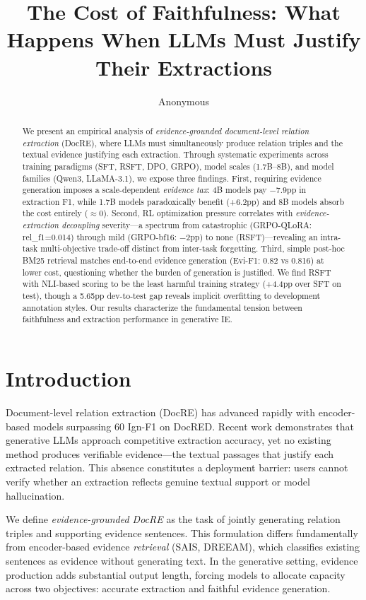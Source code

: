 \documentclass[11pt]{article}
\title{The Cost of Faithfulness: What Happens When LLMs Must Justify Their Extractions}
\author{Anonymous}
\date{}
\begin{document}
\maketitle

\begin{abstract}
We present an empirical analysis of \textit{evidence-grounded document-level relation extraction} (DocRE), where LLMs must simultaneously produce relation triples and the textual evidence justifying each extraction. Through systematic experiments across training paradigms (SFT, RSFT, DPO, GRPO), model scales (1.7B--8B), and model families (Qwen3, LLaMA-3.1), we expose three findings. First, requiring evidence generation imposes a scale-dependent \textit{evidence tax}: 4B models pay $-7.9$pp in extraction F1, while 1.7B models paradoxically benefit (+6.2pp) and 8B models absorb the cost entirely ($\approx 0$). Second, RL optimization pressure correlates with \textit{evidence-extraction decoupling} severity---a spectrum from catastrophic (GRPO-QLoRA: rel\_f1=0.014) through mild (GRPO-bf16: $-2$pp) to none (RSFT)---revealing an intra-task multi-objective trade-off distinct from inter-task forgetting. Third, simple post-hoc BM25 retrieval matches end-to-end evidence generation (Evi-F1: 0.82 vs 0.816) at lower cost, questioning whether the burden of generation is justified. We find RSFT with NLI-based scoring to be the least harmful training strategy (+4.4pp over SFT on test), though a 5.65pp dev-to-test gap reveals implicit overfitting to development annotation styles. Our results characterize the fundamental tension between faithfulness and extraction performance in generative IE.
\end{abstract}

\section{Introduction}

Document-level relation extraction (DocRE) has advanced rapidly with encoder-based models surpassing 60 Ign-F1 on DocRED. Recent work demonstrates that generative LLMs approach competitive extraction accuracy, yet no existing method produces verifiable evidence---the textual passages that justify each extracted relation. This absence constitutes a deployment barrier: users cannot verify whether an extraction reflects genuine textual support or model hallucination.

We define \textit{evidence-grounded DocRE} as the task of jointly generating relation triples and supporting evidence sentences. This formulation differs fundamentally from encoder-based evidence \textit{retrieval} (SAIS, DREEAM), which classifies existing sentences as evidence without generating text. In the generative setting, evidence production adds substantial output length, forcing models to allocate capacity across two objectives: accurate extraction and faithful evidence generation.
\end{document}
